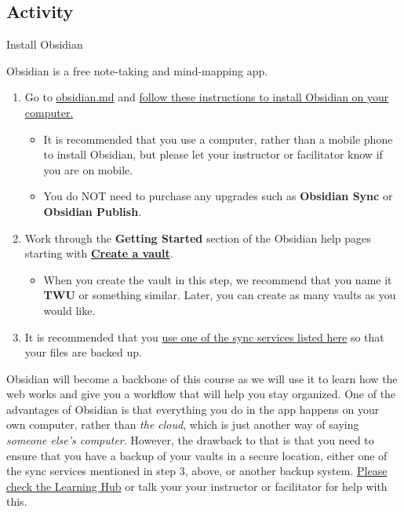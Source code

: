 \documentclass[
]{book}
\providecommand{\tightlist}{%
  \setlength{\itemsep}{0pt}\setlength{\parskip}{0pt}}
\theoremstyle{definition}
\theoremstyle{definition}
\theoremstyle{definition}
\theoremstyle{definition}
\theoremstyle{remark}
\begin{document}
\hypertarget{activity-1}{%
\subsection*{Activity}\label{activity-1}}

\begin{reflect}
{Install Obsidian}

Obsidian is a free note-taking and mind-mapping app.

\begin{enumerate}
\def\labelenumi{\arabic{enumi}.}
\tightlist
\item
  Go to \href{https://obsidian.md/download}{obsidian.md} and \href{https://help.obsidian.md/Getting+started/Download+and+install+Obsidian}{follow these instructions to install Obsidian on your computer.}

  \begin{itemize}
  \tightlist
  \item
    It is recommended that you use a computer, rather than a mobile phone to install Obsidian, but please let your instructor or facilitator know if you are on mobile.
  \item
    You do NOT need to purchase any upgrades such as \textbf{Obsidian Sync} or \textbf{Obsidian Publish}.
  \end{itemize}
\item
  Work through the \textbf{Getting Started} section of the Obsidian help pages starting with \textbf{\href{https://help.obsidian.md/Getting+started/Create+a+vault}{Create a vault}}.

  \begin{itemize}
  \tightlist
  \item
    When you create the vault in this step, we recommend that you name it \textbf{TWU} or something similar. Later, you can create as many vaults as you would like.
  \end{itemize}
\item
  It is recommended that you \href{https://help.obsidian.md/Getting+started/Sync+your+notes+across+devices}{use one of the sync services listed here} so that your files are backed up.
\end{enumerate}
\end{reflect}

Obsidian will become a backbone of this course as we will use it to learn how the web works and give you a workflow that will help you stay organized. One of the advantages of Obsidian is that everything you do in the app happens on your own computer, rather than \emph{the cloud}, which is just another way of saying \emph{someone else's computer}. However, the drawback to that is that you need to ensure that you have a backup of your vaults in a secure location, either one of the sync services mentioned in step 3, above, or another backup system. \href{https://twu.discourse.group/c/ldrs101/10}{Please check the Learning Hub} or talk your your instructor or facilitator for help with this.
\end{document}
